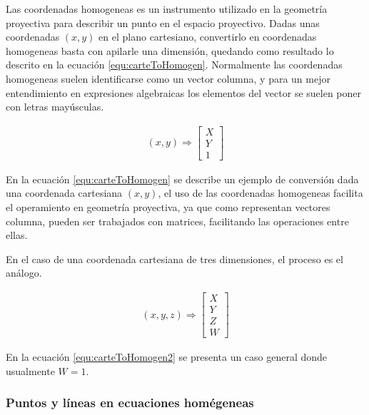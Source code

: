 Las coordenadas homogeneas es un instrumento utilizado en la geometría proyectiva para describir un punto en el espacio proyectivo. Dadas unas coordenadas $(x,y)$ en el plano cartesiano, convertirlo en coordenadas homogeneas basta con apilarle una dimensión, quedando como resultado lo descrito en la ecuación \ref{equ:carteToHomogen}. Normalmente las coordenadas homogeneas suelen identificarse como un vector columna, y para un mejor entendimiento en expresiones algebraicas los elementos del vector se suelen poner con letras mayúsculas.

\begin{equation}
    \begin{aligned}
        (x,y) \Rightarrow \left[\begin{array}{c}X\\Y\\1\end{array}\right]
    \end{aligned}
    \label{equ:carteToHomogen}
\end{equation}

En la ecuación \ref{equ:carteToHomogen} se describe un ejemplo de conversión dada una coordenada cartesiana $(x,y)$, el uso de las coordenadas homogeneas facilita el operamiento en geometría proyectiva, ya que como representan vectores columna, pueden ser trabajados con matrices, facilitando las operaciones entre ellas.

En el caso de una coordenada cartesiana de tres dimensiones, el proceso es el análogo.

\begin{equation}
    \begin{aligned}
        (x,y,z) \Rightarrow \left[\begin{array}{c}X\\Y\\Z\\W\end{array}\right]
    \end{aligned}
    \label{equ:carteToHomogen2}
\end{equation}

En la ecuación \ref{equ:carteToHomogen2} se presenta un caso general donde usualmente $W=1$.



\subsubsection{Puntos y líneas en ecuaciones homégeneas}


